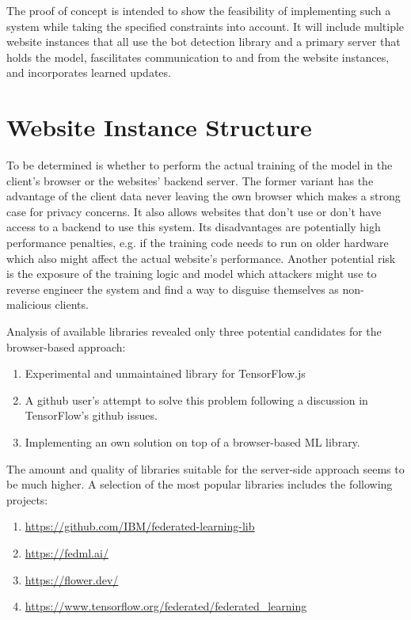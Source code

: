 \documentclass[
    fontsize=12pt,
    headings=small,
    parskip=half,           %
    bibliography=totoc,
    numbers=noenddot,       %
    open=any,               %
    ]{scrreprt}
\begin{document}
The proof of concept is intended to show the feasibility of implementing such a system while taking the specified constraints into account. It will include multiple website instances that all use the bot detection library and a primary server that holds the model, fascilitates communication to and from the website instances, and incorporates learned updates.

\section{Website Instance Structure}

To be determined is whether to perform the actual training of the model in the client's browser or the websites' backend server. The former variant has the advantage of the client data never leaving the own browser which makes a strong case for privacy concerns. It also allows websites that don't use or don't have access to a backend to use this system. Its disadvantages are potentially high performance penalties, e.g. if the training code needs to run on older hardware which also might affect the actual website's performance. Another potential risk is the exposure of the training logic and model which attackers might use to reverse engineer the system and find a way to disguise themselves as non-malicious clients.

Analysis of available libraries revealed only three potential candidates for the browser-based approach:

\begin{enumerate}
	\item Experimental and unmaintained library for TensorFlow.js \cite{PAIRFL2019}
	\item A github user's attempt \cite{SaFL2019} to solve this problem following a discussion in TensorFlow's github issues.
	\item Implementing an own solution on top of a browser-based ML library.
\end{enumerate}

The amount and quality of libraries suitable for the server-side approach seems to be much higher. A selection of the most popular libraries includes the following projects:

\begin{enumerate}
	\item \url{https://github.com/IBM/federated-learning-lib}
	\item \url{https://fedml.ai/}
	\item \url{https://flower.dev/}
	\item \url{https://www.tensorflow.org/federated/federated_learning}
\end{enumerate}
\end{document}
